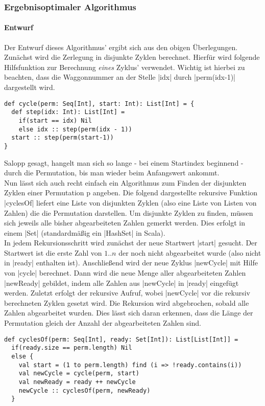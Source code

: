 \subsubsection{Ergebnisoptimaler Algorithmus}
\paragraph{Entwurf}
Der Entwurf dieses Algorithmus' ergibt sich aus den obigen Überlegungen. Zunächst wird die Zerlegung in disjunkte Zyklen berechnet.
Hierfür wird folgende Hilfsfunktion zur Berechnung \emph{eines} Zyklus' verwendet.
Wichtig ist hierbei zu beachten, dass die Waggonnummer an der Stelle |idx| durch |perm(idx-1)| dargestellt wird.
\lstset{language=Scala}
\lstset{basicstyle=\small}
\begin{lstlisting}
def cycle(perm: Seq[Int], start: Int): List[Int] = {
  def step(idx: Int): List[Int] =
    if(start == idx) Nil
    else idx :: step(perm(idx - 1))
  start :: step(perm(start-1))
}
\end{lstlisting}
Salopp gesagt, hangelt man sich so lange - bei einem Startindex beginnend - durch die Permutation, bis man wieder beim Anfangswert ankommt.\\
Nun lässt sich auch recht einfach ein Algorithmus zum Finden der disjunkten Zyklen einer Permutation p angeben.
Die folgend dargestellte rekursive Funktion |cyclesOf| liefert eine Liste von disjunkten Zyklen (also eine Liste von Listen von Zahlen)
die die Permutation darstellen. Um disjunkte Zyklen zu finden, müssen sich jeweils alle bisher abgearbeiteten Zahlen gemerkt werden.
Dies erfolgt in einem |Set| (standardmäßig ein |HashSet| in Scala). \\
In jedem Rekursionsschritt wird zunächst der neue Startwert |start| gesucht.
Der Startwert ist die erste Zahl von $1..n$ der noch nicht abgearbeitet wurde (also nicht in |ready| enthalten ist).
Anschließend wird der neue Zyklus |newCycle| mit Hilfe von |cycle| berechnet.
Dann wird die neue Menge aller abgearbeiteten Zahlen |newReady| gebildet, indem alle Zahlen aus |newCycle| in |ready| eingefügt werden.
Zuletzt erfolgt der rekursive Aufruf, wobei |newCycle| vor die rekursiv berechneten Zyklen gesetzt wird.
Die Rekursion wird abgebrochen, sobald alle Zahlen abgearbeitet wurden. Dies lässt sich daran erkennen,
dass die Länge der Permutation gleich der Anzahl der abgearbeiteten Zahlen sind. \\
\lstset{language=Scala}
\lstset{basicstyle=\small}
\begin{lstlisting}
def cyclesOf(perm: Seq[Int], ready: Set[Int]): List[List[Int]] =
  if(ready.size == perm.length) Nil
  else {
    val start = (1 to perm.length) find (i => !ready.contains(i))
    val newCycle = cycle(perm, start)
    val newReady = ready ++ newCycle
    newCycle :: cyclesOf(perm, newReady)
  }
\end{lstlisting}

